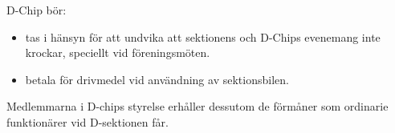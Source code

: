 \documentclass{dsekprotokoll}
\begin{document}
D-Chip bör:
\begin{itemize}
  \item tas i hänsyn för att undvika att sektionens och D-Chips
    evenemang inte krockar, speciellt vid föreningsmöten.
  \item betala för drivmedel vid användning av sektionsbilen.
\end{itemize}
Medlemmarna i D-chips styrelse erhåller dessutom de förmåner som
ordinarie funktionärer vid D-sektionen får.
\end{document}
